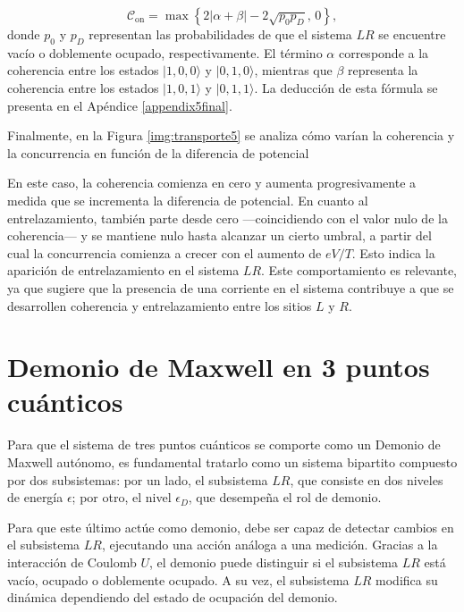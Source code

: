 \begin{equation*}
    \mathcal{C}_{\text{on}} = \max \left\{ 2|\alpha + \beta| - 2\sqrt{p_0 p_D},\, 0 \right\},
\end{equation*}
donde \( p_0 \) y \( p_D \) representan las probabilidades de que el sistema \( LR \) se encuentre vacío o doblemente ocupado, respectivamente. El término \( \alpha \) corresponde a la coherencia entre los estados \(|1,0,0\rangle\) y \(|0,1,0\rangle\), mientras que \( \beta \) representa la coherencia entre los estados \(|1,0,1\rangle\) y \(|0,1,1\rangle\). La deducción de esta fórmula se presenta en el Apéndice \ref{appendix5final}. 

Finalmente, en la Figura \ref{img:transporte5} se analiza cómo varían la coherencia y la concurrencia en función de la diferencia de potencial

    
En este caso, la coherencia comienza en cero y aumenta progresivamente a medida que se incrementa la diferencia de potencial. En cuanto al entrelazamiento, también parte desde cero —coincidiendo con el valor nulo de la coherencia— y se mantiene nulo hasta alcanzar un cierto umbral, a partir del cual la concurrencia comienza a crecer con el aumento de \( eV/T \). Esto indica la aparición de entrelazamiento en el sistema \( LR \). Este comportamiento es relevante, ya que sugiere que la presencia de una corriente en el sistema contribuye a que se desarrollen coherencia y entrelazamiento entre los sitios $L$ y $R$.  


\label{sec5:transporte}

\newpage

\section{Demonio de Maxwell en 3 puntos cuánticos}
Para que el sistema de tres puntos cuánticos se comporte como un Demonio de Maxwell autónomo, es fundamental tratarlo como un sistema bipartito compuesto por dos subsistemas: por un lado, el subsistema $LR$, que consiste en dos niveles de energía $\epsilon$; por otro, el nivel $\epsilon_D$, que desempeña el rol de demonio.

Para que este último actúe como demonio, debe ser capaz de detectar cambios en el subsistema $LR$, ejecutando una acción análoga a una medición. Gracias a la interacción de Coulomb $U$, el demonio puede distinguir si el subsistema $LR$ está vacío, ocupado o doblemente ocupado. A su vez, el subsistema $LR$ modifica su dinámica dependiendo del estado de ocupación del demonio.

